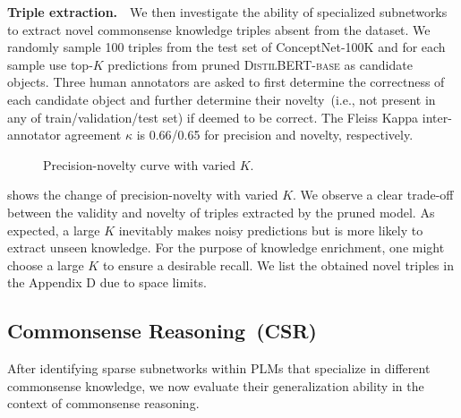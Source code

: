 \textbf{Triple extraction.}~~We then investigate the ability of specialized 
subnetworks to extract novel commonsense knowledge triples absent 
from the dataset. We randomly sample 100 triples from the test set of 
ConceptNet-100K and for each sample use top-$K$ predictions from 
pruned \textsc{DistilBERT-base} as candidate objects. 
Three human annotators are asked to first determine the correctness of 
each candidate object and further determine their novelty~(i.e., not present 
in any of train/validation/test set) if deemed to be correct. 
The Fleiss Kappa inter-annotator agreement $\kappa$ is 0.66/0.65 
for precision and novelty, respectively.
\begin{figure}[t]
	\centering
	\caption{Precision-novelty curve with varied $K$.} \label{fig:extraction}
\end{figure}
 shows the change of precision-novelty with varied $K$. We observe a clear trade-off between the validity and novelty of triples extracted by the pruned model. As expected, a large $K$ inevitably makes noisy predictions but is more likely to extract unseen knowledge. For the purpose of knowledge enrichment, one might choose a large $K$ to ensure a desirable recall. We list the obtained novel triples in the Appendix D due to space limits.






\subsection{Commonsense Reasoning~(CSR)}
\label{sec:csr}
After identifying sparse subnetworks within PLMs that specialize in different commonsense knowledge, we now evaluate their generalization ability in the context of commonsense reasoning.

